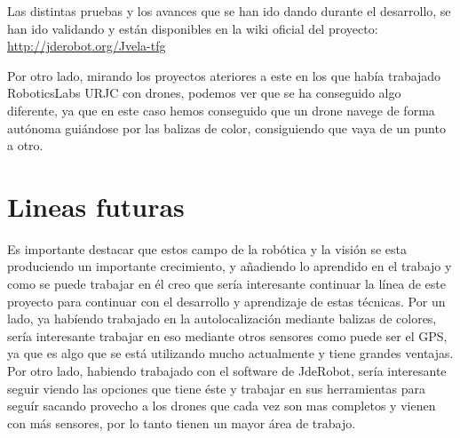 \hspace{1cm} Las distintas pruebas y los avances que se han ido dando durante el desarrollo, se han ido validando y est\'an disponibles en la wiki oficial del proyecto:\\
\underline{\url{http://jderobot.org/Jvela-tfg}}

\hspace{1cm} Por otro lado, mirando los proyectos ateriores a este en los que hab\'ia trabajado RoboticsLabs URJC con drones, podemos ver que se ha conseguido algo diferente, ya que en este caso hemos conseguido que un drone navege de forma aut\'onoma gui\'andose por las balizas de color, consiguiendo que vaya de un punto a otro. 


\section{Lineas futuras}

\hspace{1cm}Es importante destacar que estos campo de la rob\'otica y la visi\'on se esta produciendo un importante crecimiento, y añadiendo lo aprendido en el trabajo y como se puede trabajar en \'el creo que ser\'ia interesante continuar la l\'inea de este proyecto para continuar con el desarrollo y aprendizaje de estas t\'ecnicas. Por un lado, ya hab\'iendo trabajado en la autolocalizaci\'on mediante balizas de colores, ser\'ia interesante trabajar en eso mediante otros sensores como puede ser el GPS, ya que es algo que se est\'a utilizando mucho actualmente y tiene grandes ventajas. Por otro lado, habiendo trabajado con el software de JdeRobot, ser\'ia interesante seguir viendo las opciones que tiene \'este y trabajar en sus herramientas para segu\'ir sacando provecho a los drones que cada vez son mas completos y vienen con m\'as sensores, por lo tanto tienen un mayor \'area de trabajo. 






